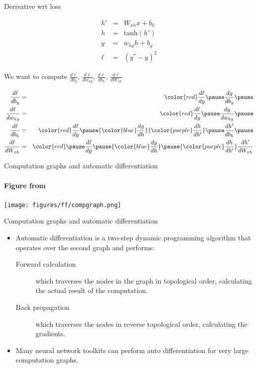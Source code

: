 \begin{frame}[shrink=5]{Derivative wrt loss}
\begin{block}{}
	\begin{eqnarray*}
		h' &=& W_{xh} x + b_h \\
		h &=& \text{tanh}(h') \\
		y &=& w_{hy} h + b_y \\
		\ell &=& (y^\ast - y)^2
	\end{eqnarray*}
	
	We want to compute $\frac{d \ell}{d b_y}$, $\frac{d \ell}{d w_{hy}}$, $\frac{d \ell}{d b_h}$, $\frac{d \ell}{d W_{xh}}$
\end{block}
\pause
\begin{block}{}
	\begin{eqnarray*}
		\frac{d \ell}{d b_y} &=& {\color{red} \frac{d \ell}{d y}} \pause \frac{d y}{d b_y} \pause \\
		\frac{d \ell}{d w_{hy}} &=& {\color{red} \frac{d \ell}{d y}} \pause \frac{d y}{d w_{hy}} \pause \\
		\frac{d \ell}{d b_h} &=& {\color{red} \frac{d \ell}{d y}} \pause {\color{blue} \frac{d y}{d h}} {\color{purple} \frac{d h}{d h'}} \pause \frac{d h'}{d b_h} \pause \\
		\frac{d \ell}{d W_{xh}} &=& {\color{red} \pause \frac{d \ell}{d y}} \pause {\color{blue} \frac{d y}{d h}} \pause {\color{purple} \frac{d h}{d h'}}\frac{d h'}{d W_{xh}} 
	\end{eqnarray*}
\end{block}

\end{frame}

\begin{frame}{Computation graphs and automatic differentiation}
\framesubtitle{Figure from \cite{Neubig2018}}
\texttt{[image: figures/ff/compgraph.png]}
\end{frame}

\begin{frame}{Computation graphs and automatic differentiation}
\begin{itemize}[<+->]
\item Automatic differentiation is a two-step dynamic programming algorithm that operates
over the second graph and performs:
\begin{description}
\item[Forward calculation] which traverses the nodes in the graph in topological order,
calculating the actual result of the computation.
\item[Back propagation] which traverses the nodes in reverse topological order, calculating
the gradients.
\end{description}
\item Many neural network toolkits can perform auto differentiation for very large computation graphs.
\end{itemize}
\end{frame}

